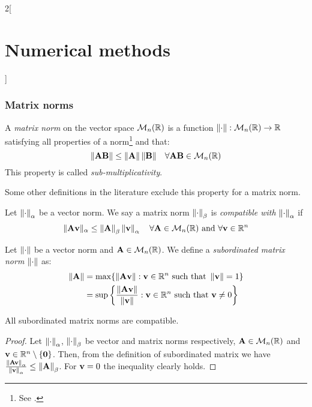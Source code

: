 \documentclass[../../../main_math.tex]{subfiles}
\begin{document}
\begin{multicols}{2}[\section{Numerical methods}]
  \subsubsection{Matrix norms}
  \begin{definition}
    A \emph{matrix norm} on the vector space $\mathcal{M}_n(\mathbb{R})$ is a function $\left\|\cdot\right\|:\mathcal{M}_n(\mathbb{R})\rightarrow\mathbb{R}$ satisfying all properties of a norm\footnote{See .} and that: $$\|\boldsymbol{\mathrm{A}}\boldsymbol{\mathrm{B}}\|\leq\left\|\boldsymbol{\mathrm{A}}\right\|\|\boldsymbol{\mathrm{B}}\|\quad\forall \boldsymbol{\mathrm{A}}\boldsymbol{\mathrm{B}}\in\mathcal{M}_n(\mathbb{R})$$
    This property is called \emph{sub-multiplicativity}.
  \end{definition}
  \begin{remark}
    Some other definitions in the literature exclude this property for a matrix norm.
  \end{remark}
  \begin{definition}
    Let $\left\|\cdot\right\|_\alpha$ be a vector norm. We say a matrix norm $\left\|\cdot\right\|_\beta$ is \emph{compatible with} $\left\|\cdot\right\|_\alpha$ if $$\|\boldsymbol{\mathrm{A}}\boldsymbol{\mathrm{v}}\|_\alpha\leq\left\|\boldsymbol{\mathrm{A}}\right\|_\beta\left\|\boldsymbol{\mathrm{v}}\right\|_\alpha\quad\forall\boldsymbol{\mathrm{A}}\in\mathcal{M}_n(\mathbb{R})\text{ and }\forall\boldsymbol{\mathrm{v}}\in\mathbb{R}^n$$
  \end{definition}
  \begin{definition}
    Let $\left\|\cdot\right\|$ be a vector norm and $\boldsymbol{\mathrm{A}}\in\mathcal{M}_n(\mathbb{R})$. We define a \emph{subordinated matrix norm} $\left\|\cdot\right\|$ as:
    \begin{align*}
      \left\|\boldsymbol{\mathrm{A}}\right\| & =\max\{\|\boldsymbol{\mathrm{A}}\boldsymbol{\mathrm{v}}\|:\boldsymbol{\mathrm{v}}\in\mathbb{R}^n\text{ such that }\left\|\boldsymbol{\mathrm{v}}\right\|=1\}                              \\
                    & =\sup\left\{\frac{\|\boldsymbol{\mathrm{A}}\boldsymbol{\mathrm{v}}\|}{\left\|\boldsymbol{\mathrm{v}}\right\|}:\boldsymbol{\mathrm{v}}\in\mathbb{R}^n\text{ such that }\boldsymbol{\mathrm{v}}\ne 0\right\}
    \end{align*}
  \end{definition}
  \begin{lemma}
    All subordinated matrix norms are compatible.
  \end{lemma}
  \begin{proof}
    Let $\left\|\cdot\right\|_\alpha$, $\left\|\cdot\right\|_\beta$ be vector and matrix norms respectively, $\boldsymbol{\mathrm{A}}\in \mathcal{M}_n(\mathbb{R})$ and $\boldsymbol{\mathrm{v}}\in\mathbb{R}^n\setminus\{\boldsymbol{\mathrm{0}}\}$. Then, from the definition of subordinated matrix we have $\frac{\left\|\boldsymbol{\mathrm{Av}}\right\|_\alpha}{\left\|\boldsymbol{\mathrm{v}}\right\|_\alpha}\leq\left\|\boldsymbol{\mathrm{A}}\right\|_\beta$. For $\boldsymbol{\mathrm{v}}=0$ the inequality clearly holds.
  \end{proof}
  \begin{lemma}

\end{lemma}
\end{multicols}
\end{document}
